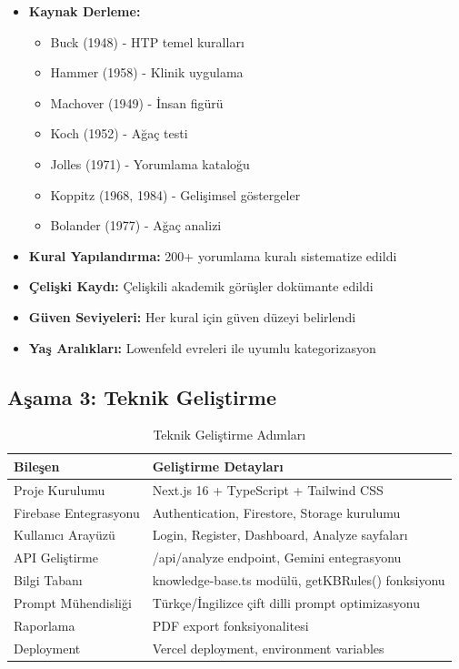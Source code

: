 \begin{itemize}
  \item \textbf{Kaynak Derleme:}
  \begin{itemize}
    \item Buck (1948) - HTP temel kuralları
    \item Hammer (1958) - Klinik uygulama
    \item Machover (1949) - İnsan figürü
    \item Koch (1952) - Ağaç testi
    \item Jolles (1971) - Yorumlama kataloğu
    \item Koppitz (1968, 1984) - Gelişimsel göstergeler
    \item Bolander (1977) - Ağaç analizi
  \end{itemize}
  \item \textbf{Kural Yapılandırma:} 200+ yorumlama kuralı sistematize edildi
  \item \textbf{Çelişki Kaydı:} Çelişkili akademik görüşler dokümante edildi
  \item \textbf{Güven Seviyeleri:} Her kural için güven düzeyi belirlendi
  \item \textbf{Yaş Aralıkları:} Lowenfeld evreleri ile uyumlu kategorizasyon
\end{itemize}

\subsection{Aşama 3: Teknik Geliştirme}

\begin{table}[H]
\centering
\caption{Teknik Geliştirme Adımları}
\label{tab:teknikdev}
\begin{tabular}{p{4cm}p{9cm}}
\toprule
\textbf{Bileşen} & \textbf{Geliştirme Detayları} \\
\midrule
Proje Kurulumu & Next.js 16 + TypeScript + Tailwind CSS \\
Firebase Entegrasyonu & Authentication, Firestore, Storage kurulumu \\
Kullanıcı Arayüzü & Login, Register, Dashboard, Analyze sayfaları \\
API Geliştirme & /api/analyze endpoint, Gemini entegrasyonu \\
Bilgi Tabanı & knowledge-base.ts modülü, getKBRules() fonksiyonu \\
Prompt Mühendisliği & Türkçe/İngilizce çift dilli prompt optimizasyonu \\
Raporlama & PDF export fonksiyonalitesi \\
Deployment & Vercel deployment, environment variables \\
\bottomrule
\end{tabular}
\end{table}

